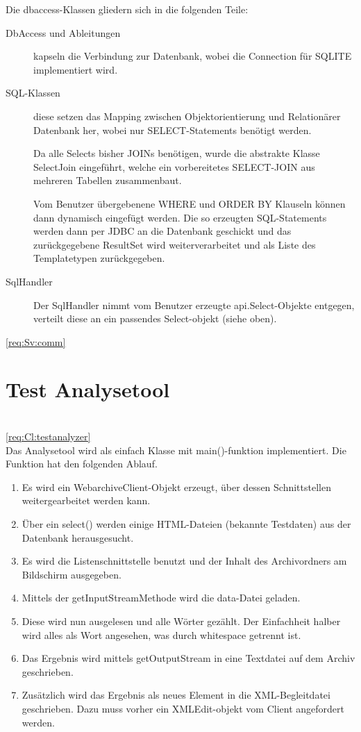 Die dbaccess-Klassen gliedern sich in die folgenden Teile:
\begin{description}
	\item [DbAccess und Ableitungen] kapseln die Verbindung zur Datenbank,
		wobei die Connection für SQLITE implementiert wird.
	\item [SQL-Klassen] diese setzen das Mapping zwischen Objektorientierung und Relationärer Datenbank her, 
		wobei nur SELECT-Statements benötigt werden. 

		Da alle Selects bisher JOINs benötigen, 
		wurde die abstrakte Klasse SelectJoin eingeführt, 
		welche ein vorbereitetes SELECT-JOIN aus mehreren Tabellen zusammenbaut.

		Vom Benutzer übergebenene WHERE und ORDER BY Klauseln können dann dynamisch eingefügt werden. 
		Die so erzeugten SQL-Statements werden dann per JDBC an die Datenbank geschickt und 
		das zurückgegebene ResultSet wird weiterverarbeitet und als Liste des Templatetypen zurückgegeben.
	\item [SqlHandler]
		Der SqlHandler nimmt vom Benutzer erzeugte api.Select-Objekte entgegen, 
		verteilt diese an ein passendes Select-objekt (siehe oben).
\end{description}

\ref{req:Sv:comm}
\section{Test Analysetool} 
\liable{\sab} \\
\ref{req:Cl:testanalyzer} \\
	Das Analysetool wird als einfach Klasse mit main()-funktion implementiert.
	Die Funktion hat den folgenden Ablauf.
	\begin{enumerate}
		\item Es wird ein WebarchiveClient-Objekt erzeugt, über dessen Schnittstellen weitergearbeitet werden kann.
		\item Über ein select() werden einige HTML-Dateien (bekannte Testdaten) aus der Datenbank herausgesucht.
		\item Es wird die Listenschnittstelle benutzt und der Inhalt des Archivordners am Bildschirm ausgegeben.
		\item Mittels der getInputStreamMethode wird die data-Datei geladen.
		\item Diese wird nun ausgelesen und alle Wörter gezählt. Der Einfachheit halber wird alles als Wort angesehen, was durch whitespace getrennt ist.
		\item Das Ergebnis wird mittels  getOutputStream in eine Textdatei auf dem Archiv geschrieben.
		\item Zusätzlich wird das Ergebnis als neues Element in die XML-Begleitdatei geschrieben.
			Dazu muss vorher ein XMLEdit-objekt vom Client angefordert werden.
	\end{enumerate}
		

